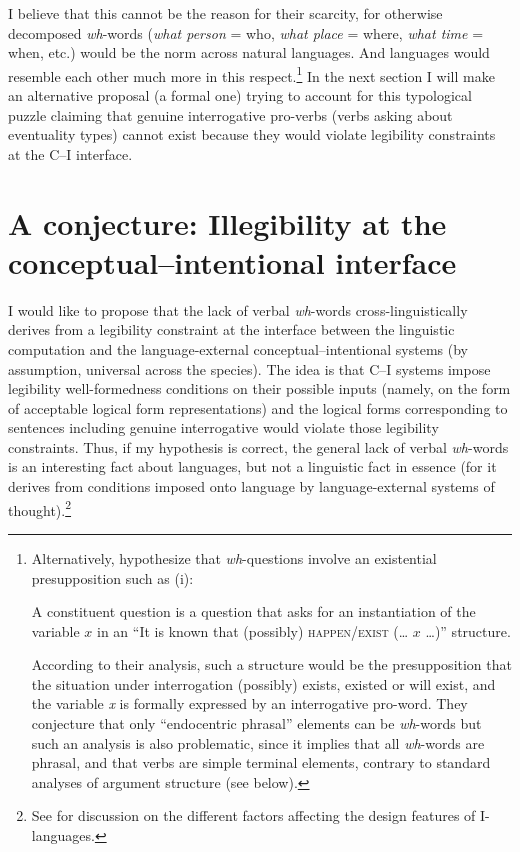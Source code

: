 \documentclass[output=paper]{langsci/langscibook}
\begin{document}
I believe that this cannot be the reason for their scarcity, for otherwise
decomposed \emph{wh}-words (\emph{what person} = who, \emph{what place}
= where, \emph{what time} = when, etc.) would be the norm across natural
languages. And languages would resemble each other much more in this
respect.\footnote{Alternatively, \citet{idiatov.vanderauwera2004} hypothesize
    that \emph{wh}-questions involve an existential presupposition such as
    (i):

\begin{exe}
 \label{i} A constituent question is a question that asks for an
instantiation of the variable $x$ in an ``It is known that (possibly) \textsc{happen}\slash\textsc{exist}%
(\dots{} $x$ \dots{})'' structure.
\end{exe}
According to their analysis, such a structure would be the presupposition that
the situation under interrogation (possibly) exists, existed or will exist, and
the variable \emph{x} is formally expressed by an interrogative pro-word. They
conjecture that only ``endocentric phrasal'' elements can be \emph{wh}-words but such an analysis is also problematic, since it implies that all \emph{wh}-words are phrasal, and that verbs are simple terminal elements, contrary to standard analyses of argument structure (see below).}
In the next section I will make an alternative proposal (a formal one) trying
to account for this typological puzzle claiming that genuine interrogative
pro-verbs (verbs asking about eventuality types) cannot exist because they
would violate legibility constraints at the C--I interface.

\section{A conjecture: Illegibility at the conceptual--intentional
interface}\label{sec:3}

I would like to propose that the lack of verbal \emph{wh}-words
cross-linguistically derives from a legibility constraint at the interface
between the linguistic computation and the language-external
conceptual--intentional systems (by assumption, universal across the species).
The idea is that C--I systems impose legibility well-formedness conditions on
their possible inputs (namely, on the form of acceptable logical form
representations) and the logical forms corresponding to sentences including
genuine interrogative  would violate those legibility constraints.
Thus, if my hypothesis is correct, the general lack of verbal \emph{wh}-words
is an interesting fact about languages, but not a linguistic fact in essence
(for it derives from conditions imposed onto language by language-external
systems of thought).\footnote{See
\citet{Chomsky2005,BerwickEtAl2011,Roberts2012,biberauer.roberts2017} for
discussion on the different factors affecting the design features of
I-languages.}
\end{document}
